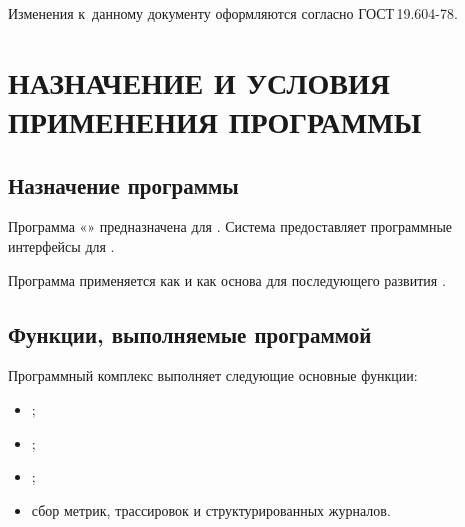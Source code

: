 \documentclass[12pt,a4paper]{extarticle}
\begin{document}
Изменения к~данному документу оформляются согласно ГОСТ\,19.604-78\cite{gost19604}.

\clearpage

\hypersetup{linkcolor=black}
\tableofcontents
\hypersetup{linkcolor=blue}
\thispagestyle{fancy}
\clearpage

\section{НАЗНАЧЕНИЕ И УСЛОВИЯ ПРИМЕНЕНИЯ ПРОГРАММЫ}

\subsection{Назначение программы}

\begin{hseExample}
Программа «\projectname» предназначена для . Система предоставляет  программные интерфейсы для .

Программа применяется как  и как основа для последующего развития .
\end{hseExample}

\subsection{Функции, выполняемые программой}

\begin{hseExample}
Программный комплекс выполняет следующие основные функции:

\begin{itemize}[leftmargin=1.25cm]
    \item {};
    \item {};
    \item {};
    \item сбор метрик, трассировок и структурированных журналов.
\end{itemize}
\end{hseExample}
\end{document}
